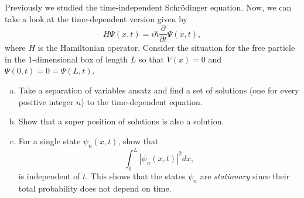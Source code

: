 \documentclass[12pt]{article} %
\begin{document}
\newpage
\begin{problem}
Previously we studied the time-independent Schr\"odinger equation. Now, we can take a look at the time-dependent version given by
\[
H \Psi(x,t) = i\hbar \frac{\partial}{\partial t} \Psi(x,t),
\]
where $H$ is the Hamiltonian operator.  Consider the situation for the free particle in the 1-dimensional box of length $L$ so that $V(x)=0$ and $\Psi(0,t)=0=\Psi(L,t)$.  
\begin{enumerate}[(a)]
    \item Take a separation of variables ansatz and find a set of solutions (one for every positive integer $n$) to the time-dependent equation.
    \item Show that a super position of solutions is also a solution.
    \item For a single state $\psi_n(x,t)$, show that 
    \[
    \int_0^L \left|\psi_n(x,t)\right|^2 dx,
    \]
    is independent of $t$. This shows that the states $\psi_n$ are \emph{stationary} since their total probability does not depend on time.
\end{enumerate}
\end{problem}
\end{document}
